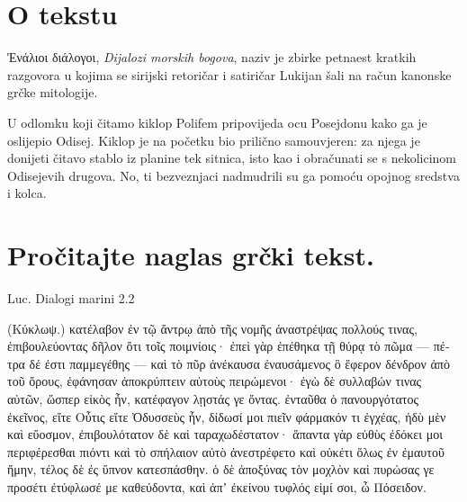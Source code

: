 


\section*{O tekstu}

Ἐνάλιοι διάλογοι, \textit{Dijalozi morskih bogova}, naziv je zbirke petnaest kratkih razgovora u kojima se sirijski retoričar i satiričar Lukijan šali na račun kanonske grčke mitologije.

U odlomku koji čitamo kiklop Polifem pripovijeda ocu Posejdonu kako ga je oslijepio Odisej. Kiklop je na početku bio prilično samouvjeren: za njega je donijeti čitavo stablo iz planine tek sitnica, isto kao i obračunati se s nekolicinom Odisejevih drugova. No, ti bezveznjaci nadmudrili su ga pomoću opojnog sredstva i kolca.



\section*{Pročitajte naglas grčki tekst.}

Luc. Dialogi marini 2.2


\medskip


{\large

\begin{greek}

\noindent (Κύκλωψ.) κατέλαβον ἐν τῷ ἄντρῳ ἀπὸ τῆς νομῆς ἀναστρέψας πολλούς τινας, ἐπιβουλεύοντας δῆλον ὅτι τοῖς ποιμνίοις· ἐπεὶ γὰρ ἐπέθηκα τῇ θύρᾳ τὸ πῶμα — πέτρα δέ ἐστι παμμεγέθης — καὶ τὸ πῦρ ἀνέκαυσα ἐναυσάμενος ὃ ἔφερον δένδρον ἀπὸ τοῦ ὄρους, ἐφάνησαν ἀποκρύπτειν αὑτοὺς πειρώμενοι· ἐγὼ δὲ συλλαβών τινας αὐτῶν, ὥσπερ εἰκὸς ἦν, κατέφαγον λῃστάς γε ὄντας. ἐνταῦθα ὁ πανουργότατος ἐκεῖνος, εἴτε Οὖτις εἴτε Ὀδυσσεὺς ἦν, δίδωσί μοι πιεῖν φάρμακόν τι ἐγχέας, ἡδὺ μὲν καὶ εὔοσμον, ἐπιβουλότατον δὲ καὶ ταραχωδέστατον· ἅπαντα γὰρ εὐθὺς ἐδόκει μοι περιφέρεσθαι πιόντι καὶ τὸ σπήλαιον αὐτὸ ἀνεστρέφετο καὶ οὐκέτι ὅλως ἐν ἐμαυτοῦ ἤμην, τέλος δὲ ἐς ὕπνον κατεσπάσθην. ὁ δὲ ἀποξύνας τὸν μοχλὸν καὶ πυρώσας γε προσέτι ἐτύφλωσέ με καθεύδοντα, καὶ ἀπʼ ἐκείνου τυφλός εἰμί σοι, ὦ Πόσειδον.


\end{greek}

}


